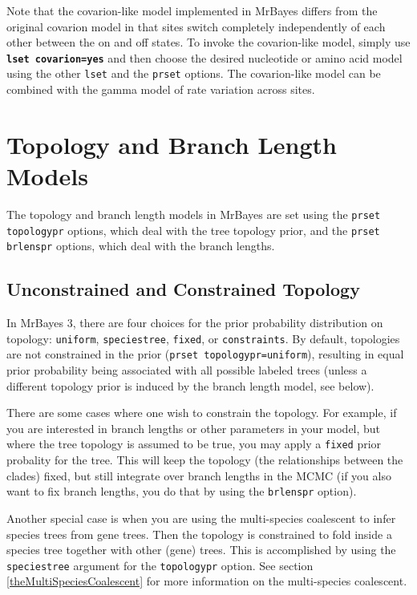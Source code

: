 \documentclass[12pt]{book}
\newcommand{\ttt}[1]{\texttt{#1}}
\newcommand{\tb}[1]{\ttt{\textbf{#1}}}
\begin{document}
Note that the covarion-like model implemented in MrBayes differs from the original covarion model
in that sites switch completely independently of each other between the on and off states. To
invoke the covarion-like model, simply use \tb{lset covarion=yes} and then choose the desired
nucleotide or amino acid model using the other \ttt{lset} and the \ttt{prset} options. The
covarion-like model can be combined with the gamma model of rate variation across sites.


\section{Topology and Branch Length Models}

The topology and branch length models in MrBayes are set using the \ttt{prset topologypr} options,
which deal with the tree topology prior, and the \ttt{prset brlenspr} options, which deal with the
branch lengths.

\subsection{Unconstrained and Constrained Topology}
\label{unconstrainedAndConstrainedTopology}

In MrBayes 3, there are four choices for the prior probability distribution on topology:
\ttt{uniform}, \ttt{speciestree}, \ttt{fixed}, or \ttt{constraints}. By default, topologies are not
constrained in the prior (\ttt{prset topologypr=uniform}), resulting in equal prior probability
being associated with all possible labeled trees (unless a different topology prior is induced by
the branch length model, see below).

There are some cases where one wish to constrain the topology. For example, if you are interested
in branch lengths or other parameters in your model, but where the tree topology is assumed to be
true, you may apply a \ttt{fixed} prior probality for the tree. This will keep the topology (the
relationships between the clades) fixed, but still integrate over branch lengths in the MCMC (if
you also want to fix branch lengths, you do that by using the \ttt{brlenspr} option).

Another special case is when you are using the multi-species coalescent to infer species trees from
gene trees. Then the topology is constrained to fold inside a species tree together with other
(gene) trees. This is accomplished by using the \ttt{speciestree} argument for the \ttt{topologypr}
option. See section \ref{theMultiSpeciesCoalescent} for more information on the multi-species
coalescent.
\end{document}
